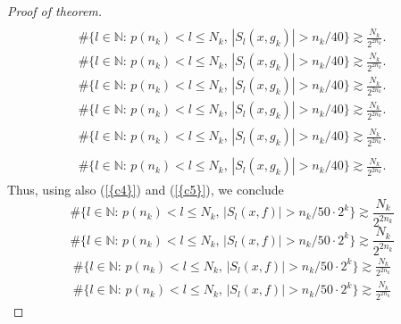\documentclass{amsart}
\numberwithin{equation}{section}
\begin{document}
\begin{proof}[Proof of theorem]
{\begin{align}
\end{align}\fi    
{}\begin{gather*}
\#\{l\in {\ensuremath{\mathbb N}}:\,p(n_k)<l\le N_k,\, |S_l(x,g_k)|>n_k/40 \}\gtrsim \frac{N_k}{2^{2n_k}}.
\end{gather*}\fi  
{}\begin{gather}
\#\{l\in {\ensuremath{\mathbb N}}:\,p(n_k)<l\le N_k,\, |S_l(x,g_k)|>n_k/40 \}\gtrsim \frac{N_k}{2^{2n_k}}.
\end{gather}\fi   
{}\begin{multline*}
\#\{l\in {\ensuremath{\mathbb N}}:\,p(n_k)<l\le N_k,\, |S_l(x,g_k)|>n_k/40 \}\gtrsim \frac{N_k}{2^{2n_k}}.
\end{multline*}\fi  
{}\begin{multline}
\#\{l\in {\ensuremath{\mathbb N}}:\,p(n_k)<l\le N_k,\, |S_l(x,g_k)|>n_k/40 \}\gtrsim \frac{N_k}{2^{2n_k}}.
\end{multline}\fi  
{}\begin{multline*}\begin{split}
\#\{l\in {\ensuremath{\mathbb N}}:\,p(n_k)<l\le N_k,\, |S_l(x,g_k)|>n_k/40 \}\gtrsim \frac{N_k}{2^{2n_k}}.
\end{split}\end{multline*}\fi
{}\begin{multline}\begin{split}
\#\{l\in {\ensuremath{\mathbb N}}:\,p(n_k)<l\le N_k,\, |S_l(x,g_k)|>n_k/40 \}\gtrsim \frac{N_k}{2^{2n_k}}.
\end{split}\end{multline}\fi
}
Thus, using also {(\ref{{c4}})} and {(\ref{{c5}})}, we conclude
{
\begin{equation*} 
\#\{l\in {\ensuremath{\mathbb N}}:\,p(n_k)<l\le N_k,\, |S_l(x,f)|> n_k/50\cdot  2^k \}\gtrsim \frac{N_k}{2^{2n_k}}
 \end{equation*}\fi  
{}\begin{equation}
\#\{l\in {\ensuremath{\mathbb N}}:\,p(n_k)<l\le N_k,\, |S_l(x,f)|> n_k/50\cdot  2^k \}\gtrsim \frac{N_k}{2^{2n_k}}
\end{equation}\fi   
{}\begin{align*}
\#\{l\in {\ensuremath{\mathbb N}}:\,p(n_k)<l\le N_k,\, |S_l(x,f)|> n_k/50\cdot  2^k \}\gtrsim \frac{N_k}{2^{2n_k}}
\end{align*}\fi   
{}\begin{align}
\#\{l\in {\ensuremath{\mathbb N}}:\,p(n_k)<l\le N_k,\, |S_l(x,f)|> n_k/50\cdot  2^k \}\gtrsim \frac{N_k}{2^{2n_k}}

\end{align}}
\end{proof}
\end{document}
